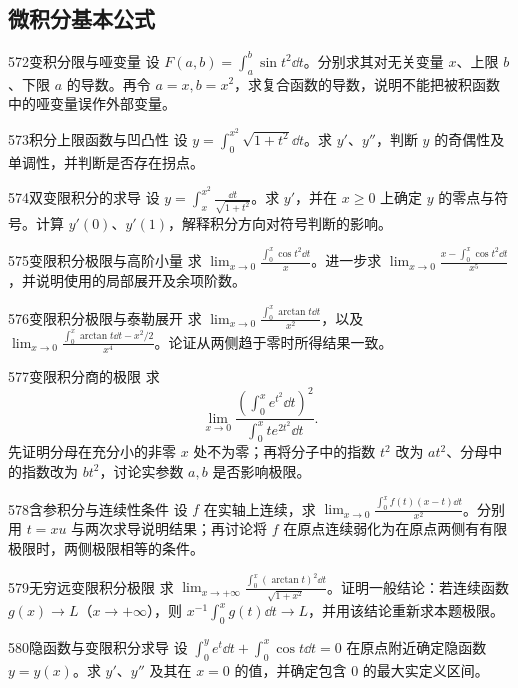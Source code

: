 \subsection{微积分基本公式}
\begin{exercise}{572}{变积分限与哑变量}
设 $F(a,b)=\int_a^b\sin t^2\dd t$。分别求其对无关变量 $x$、上限 $b$、下限 $a$ 的导数。再令 $a=x,b=x^2$，求复合函数的导数，说明不能把被积函数中的哑变量误作外部变量。
\end{exercise}
\begin{exercise}{573}{积分上限函数与凹凸性}
设 $y=\int_0^{x^2}\sqrt{1+t^2}\dd t$。求 $y'$、$y''$，判断 $y$ 的奇偶性及单调性，并判断是否存在拐点。
\end{exercise}
\begin{exercise}{574}{双变限积分的求导}
设 $y=\int_x^{x^2}\frac{\dd t}{\sqrt{1+t^2}}$。求 $y'$，并在 $x\ge0$ 上确定 $y$ 的零点与符号。计算 $y'(0)$、$y'(1)$，解释积分方向对符号判断的影响。
\end{exercise}
\begin{exercise}{575}{变限积分极限与高阶小量}
求 $\lim_{x\to0}\frac{\int_0^x\cos t^2\dd t}{x}$。进一步求 $\lim_{x\to0}\frac{x-\int_0^x\cos t^2\dd t}{x^5}$，并说明使用的局部展开及余项阶数。
\end{exercise}
\begin{exercise}{576}{变限积分极限与泰勒展开}
求 $\lim_{x\to0}\frac{\int_0^x\arctan t\dd t}{x^2}$，以及 $\lim_{x\to0}\frac{\int_0^x\arctan t\dd t-x^2/2}{x^4}$。论证从两侧趋于零时所得结果一致。
\end{exercise}
\begin{exercise}{577}{变限积分商的极限}
求
\[
\lim_{x\to0}\frac{\left(\int_0^xe^{t^2}\dd t\right)^2}{\int_0^xte^{2t^2}\dd t}.
\]
先证明分母在充分小的非零 $x$ 处不为零；再将分子中的指数 $t^2$ 改为 $at^2$、分母中的指数改为 $bt^2$，讨论实参数 $a,b$ 是否影响极限。
\end{exercise}
\begin{exercise}{578}{含参积分与连续性条件}
设 $f$ 在实轴上连续，求 $\lim_{x\to0}\frac{\int_0^xf(t)(x-t)\dd t}{x^2}$。分别用 $t=xu$ 与两次求导说明结果；再讨论将 $f$ 在原点连续弱化为在原点两侧有有限极限时，两侧极限相等的条件。
\end{exercise}
\begin{exercise}{579}{无穷远变限积分极限}
求 $\lim_{x\to+\infty}\frac{\int_0^x(\arctan t)^2\dd t}{\sqrt{1+x^2}}$。证明一般结论：若连续函数 $g(x)\to L$（$x\to+\infty$），则 $x^{-1}\int_0^xg(t)\dd t\to L$，并用该结论重新求本题极限。
\end{exercise}
\begin{exercise}{580}{隐函数与变限积分求导}
设 $\int_0^ye^t\dd t+\int_0^x\cos t\dd t=0$ 在原点附近确定隐函数 $y=y(x)$。求 $y'$、$y''$ 及其在 $x=0$ 的值，并确定包含 $0$ 的最大实定义区间。
\end{exercise}
